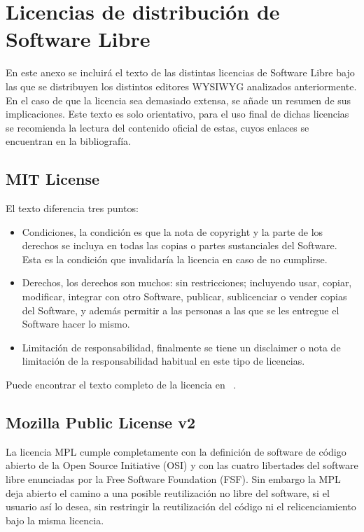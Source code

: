 \chapter{Licencias de distribución de Software Libre}

En este anexo se incluirá el texto de las distintas licencias de Software Libre bajo las que se distribuyen los distintos editores WYSIWYG analizados anteriormente. En el caso de que la licencia sea demasiado extensa, se añade un resumen de sus implicaciones. Este texto es solo orientativo, para el uso final de dichas licencias se recomienda la lectura del contenido oficial de estas, cuyos enlaces se encuentran en la bibliografía.

\section{MIT License}
El texto diferencia tres puntos:
\begin{itemize}
    \item Condiciones, la condición es que la nota de copyright y la parte de los derechos se incluya en todas las copias o partes sustanciales del Software. Esta es la condición que invalidaría la licencia en caso de no cumplirse.
    \item Derechos, los derechos son muchos: sin restricciones; incluyendo usar, copiar, modificar, integrar con otro Software, publicar, sublicenciar o vender copias del Software, y además permitir a las personas a las que se les entregue el Software hacer lo mismo.
    \item Limitación de responsabilidad, finalmente se tiene un disclaimer o nota de limitación de la responsabilidad habitual en este tipo de licencias.
\end{itemize}

Puede encontrar el texto completo de la licencia en ~\cite{MITL:mitl}.

\section{Mozilla Public License v2}

La licencia MPL cumple completamente con la definición de software de código abierto de la Open Source Initiative (OSI) y con las cuatro libertades del software libre enunciadas por la Free Software Foundation (FSF). Sin embargo la MPL deja abierto el camino a una posible reutilización no libre del software, si el usuario así lo desea, sin restringir la reutilización del código ni el relicenciamiento bajo la misma licencia.

